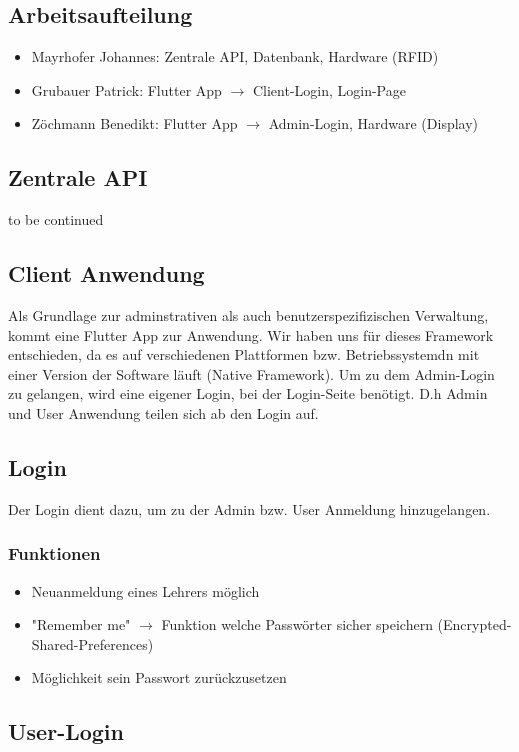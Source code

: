 \documentclass[a4paper]{article}
\begin{document}
\pagebreak

\subsection{Arbeitsaufteilung}
\begin{itemize}
  \item Mayrhofer Johannes: Zentrale API, Datenbank, Hardware (RFID)
  \item Grubauer Patrick: Flutter App $\rightarrow$ Client-Login, Login-Page
  \item Zöchmann Benedikt: Flutter App $\rightarrow$ Admin-Login, Hardware (Display)
\end{itemize}

\subsection{Zentrale API}
to be continued

\subsection{Client Anwendung}
Als Grundlage zur adminstrativen als auch benutzerspezifizischen Verwaltung, kommt eine Flutter App zur Anwendung. Wir haben uns für dieses Framework entschieden, da es auf verschiedenen Plattformen bzw. Betriebssystemdn mit einer Version der Software läuft (Native Framework). Um zu dem Admin-Login zu gelangen, wird eine eigener Login, bei der Login-Seite benötigt. D.h Admin und User Anwendung teilen sich ab den Login auf.

\subsection{Login}
Der Login dient dazu, um zu der Admin bzw. User Anmeldung hinzugelangen.
\subsubsection{Funktionen}
\begin{itemize}
  \item Neuanmeldung eines Lehrers möglich
  \item "Remember me" $\rightarrow$ Funktion welche Passwörter sicher speichern (Encrypted-Shared-Preferences)
  \item Möglichkeit sein Passwort zurückzusetzen  
\end{itemize}

\subsection{User-Login}
\end{document}
